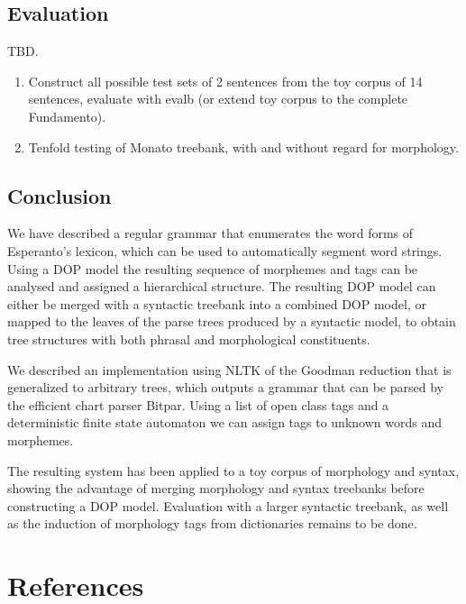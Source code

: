 \documentclass[10pt,a4paper]{article}
\begin{document}
\subsection{Evaluation}

TBD. 

\begin{enumerate}
\item Construct all possible test sets of 2 sentences from the toy corpus of 14
sentences, evaluate with evalb (or extend toy corpus to the complete
Fundamento).
\item Tenfold testing of Monato treebank, with and without regard for morphology.
\end{enumerate}

\subsection{Conclusion}

We have described a regular grammar that enumerates the word forms of
Esperanto's lexicon, which can be used to automatically segment word strings.
Using a DOP model the resulting sequence of morphemes and tags can be analysed
and assigned a hierarchical structure. The resulting DOP model can either be
merged with a syntactic treebank into a combined DOP model, or mapped to the
leaves of the parse trees produced by a syntactic model, to obtain tree
structures with both phrasal and morphological constituents.

We described an implementation using NLTK of the Goodman reduction that is
generalized to arbitrary trees, which outputs a grammar that can be parsed by
the efficient chart parser Bitpar. Using a list of open class tags and a
deterministic finite state automaton we can assign tags to unknown words and
morphemes.

The resulting system has been applied to a toy corpus of morphology and
syntax, showing the advantage of merging morphology and syntax treebanks
before constructing a DOP model. Evaluation with a larger syntactic treebank,
as well as the induction of morphology tags from dictionaries remains to be
done.


\section{References}
\end{document}

